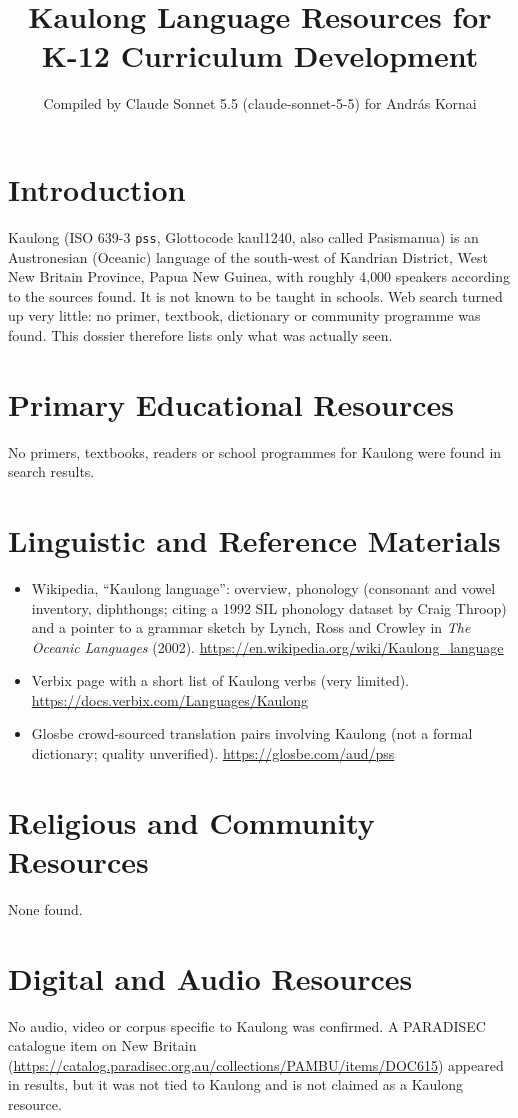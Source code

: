 \documentclass[12pt]{article}
\title{Kaulong Language Resources for K-12 Curriculum Development}
\author{Compiled by Claude Sonnet 5.5 (claude-sonnet-5-5) for Andr\'as Kornai}
\date{}
\begin{document}
\maketitle

\section{Introduction}
Kaulong (ISO 639-3 \texttt{pss}, Glottocode kaul1240, also called Pasismanua) is an Austronesian (Oceanic) language of the south-west of Kandrian District, West New Britain Province, Papua New Guinea, with roughly 4{,}000 speakers according to the sources found. It is not known to be taught in schools. Web search turned up very little: no primer, textbook, dictionary or community programme was found. This dossier therefore lists only what was actually seen.

\section{Primary Educational Resources}
No primers, textbooks, readers or school programmes for Kaulong were found in search results.

\section{Linguistic and Reference Materials}
\begin{itemize}
\item Wikipedia, ``Kaulong language'': overview, phonology (consonant and vowel inventory, diphthongs; citing a 1992 SIL phonology dataset by Craig Throop) and a pointer to a grammar sketch by Lynch, Ross and Crowley in \emph{The Oceanic Languages} (2002). \url{https://en.wikipedia.org/wiki/Kaulong_language}
\item Verbix page with a short list of Kaulong verbs (very limited). \url{https://docs.verbix.com/Languages/Kaulong}
\item Glosbe crowd-sourced translation pairs involving Kaulong (not a formal dictionary; quality unverified). \url{https://glosbe.com/aud/pss}
\end{itemize}

\section{Religious and Community Resources}
None found.

\section{Digital and Audio Resources}
No audio, video or corpus specific to Kaulong was confirmed. A PARADISEC catalogue item on New Britain (\url{https://catalog.paradisec.org.au/collections/PAMBU/items/DOC615}) appeared in results, but it was not tied to Kaulong and is not claimed as a Kaulong resource.
\end{document}
